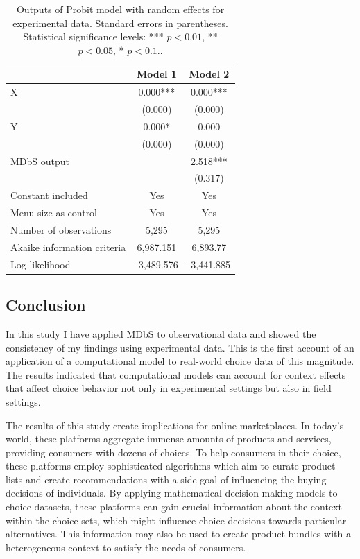 \documentclass[a4paper,12pt]{article}
\begin{document}
\begin{table}
    \centering
    \renewcommand{\arraystretch}{1.5}
    \begin{tabular}{lcc}
    \hline
     & Model 1 & Model 2 \\
    \hline
    X & 0.000*** & 0.000*** \\
     & ($0.000$) & ($0.000$) \\[1ex]
    Y & 0.000* & 0.000 \\
     & ($0.000$) & ($0.000$) \\[1ex]
    MDbS output & & 2.518*** \\
     & & (0.317) \\[1ex]
    Constant included & Yes & Yes \\[1ex]
    Menu size as control & Yes & Yes \\[1ex]
    Number of observations & 5,295 & 5,295 \\[1ex]
    Akaike information criteria & 6,987.151 & 6,893.77 \\[1ex]
    Log-likelihood & -3,489.576 & -3,441.885 \\
    \hline
    \end{tabular}
    \caption[Outputs of Probit model for experimental data]{Outputs of Probit model with random effects for experimental data. Standard errors in parentheses. Statistical significance levels: *** $p<0.01$, ** $p<0.05$, * $p<0.1.$.}
    \label{tab:noguchiProbitResults}
\end{table}

\subsection{Conclusion}

In this study I have applied MDbS to observational data and showed the consistency of my findings using experimental data. This is the first account of an application of a computational model to real-world choice data of this magnitude. The results indicated that computational models can account for context effects that affect choice behavior not only in experimental settings but also in field settings.

The results of this study create implications for online marketplaces. In today's world, these platforms aggregate immense amounts of products and services, providing consumers with dozens of choices. To help consumers in their choice, these platforms employ sophisticated algorithms which aim to curate product lists and create recommendations with a side goal of influencing the buying decisions of individuals. By applying mathematical decision-making models to choice datasets, these platforms can gain crucial information about the context within the choice sets, which might influence choice decisions towards particular alternatives. This information may also be used to create product bundles with a heterogeneous context to satisfy the needs of consumers.
\end{document}
